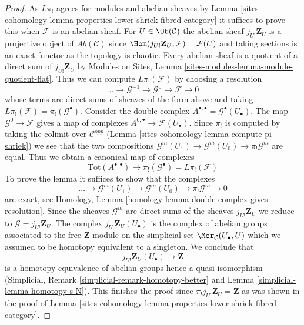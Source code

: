 \begin{proof}
As $L\pi_!$ agrees for modules and abelian sheaves by
Lemma \ref{sites-cohomology-lemma-properties-lower-shriek-fibred-category}
it suffices to prove this when $\mathcal{F}$ is an abelian sheaf.
For $U \in \Ob(\mathcal{C})$ the abelian sheaf $j_{U!}\mathbf{Z}_U$
is a projective object of $\textit{Ab}(\mathcal{C})$ since
$\Hom(j_{U!}\mathbf{Z}_U, \mathcal{F}) = \mathcal{F}(U)$
and taking sections is an exact functor as the topology is chaotic.
Every abelian sheaf is a quotient of a direct sum of $j_{U!}\mathbf{Z}_U$
by Modules on Sites, Lemma \ref{sites-modules-lemma-module-quotient-flat}.
Thus we can compute $L\pi_!(\mathcal{F})$ by choosing a resolution
$$
\ldots \to \mathcal{G}^{-1} \to \mathcal{G}^0 \to \mathcal{F} \to 0
$$
whose terms are direct sums of sheaves of the form above and taking
$L\pi_!(\mathcal{F}) = \pi_!(\mathcal{G}^\bullet)$. Consider the
double complex
$A^{\bullet, \bullet} = \mathcal{G}^\bullet(U_\bullet)$.
The map $\mathcal{G}^0 \to \mathcal{F}$ gives a map of complexes
$A^{0, \bullet} \to \mathcal{F}(U_\bullet)$.
Since $\pi_!$ is computed by taking the colimit over
$\mathcal{C}^{opp}$ (Lemma \ref{sites-cohomology-lemma-compute-pi-shriek})
we see that the two compositions
$\mathcal{G}^m(U_1) \to \mathcal{G}^m(U_0) \to \pi_!\mathcal{G}^m$
are equal. Thus we obtain a canonical map of complexes
$$
\text{Tot}(A^{\bullet, \bullet})
\longrightarrow
\pi_!(\mathcal{G}^\bullet) = L\pi_!(\mathcal{F})
$$
To prove the lemma it suffices to show that the complexes
$$
\ldots \to \mathcal{G}^m(U_1) \to \mathcal{G}^m(U_0) \to
\pi_!\mathcal{G}^m \to 0
$$
are exact, see Homology, Lemma
\ref{homology-lemma-double-complex-gives-resolution}.
Since the sheaves $\mathcal{G}^m$ are direct sums of the sheaves
$j_{U!}\mathbf{Z}_U$ we reduce to $\mathcal{G} = j_{U!}\mathbf{Z}_U$.
The complex $j_{U!}\mathbf{Z}_U(U_\bullet)$
is the complex of abelian groups associated to the free
$\mathbf{Z}$-module on the simplicial set
$\Mor_\mathcal{C}(U_\bullet, U)$ which we assumed to be homotopy
equivalent to a singleton. We conclude that
$$
j_{U!}\mathbf{Z}_U(U_\bullet) \to \mathbf{Z}
$$
is a homotopy equivalence of abelian groups hence a quasi-isomorphism
(Simplicial, Remark \ref{simplicial-remark-homotopy-better} and
Lemma \ref{simplicial-lemma-homotopy-s-N}). This finishes the proof
since $\pi_!j_{U!}\mathbf{Z}_U = \mathbf{Z}$
as was shown in the proof of
Lemma \ref{sites-cohomology-lemma-properties-lower-shriek-fibred-category}.
\end{proof}

